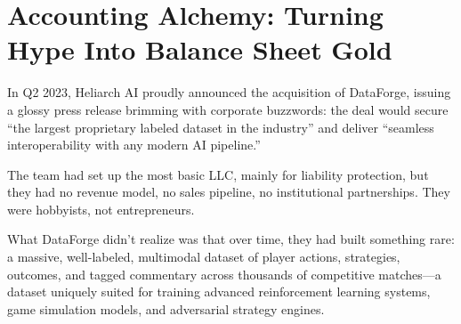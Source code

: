 \section{Accounting Alchemy: Turning Hype Into Balance Sheet Gold}

In Q2 2023, Heliarch AI proudly announced the acquisition of DataForge, issuing a glossy press release brimming with corporate buzzwords:
the deal would secure “the largest proprietary labeled dataset in the industry” and deliver “seamless interoperability with any modern AI pipeline.”

The team had set up the most basic LLC, mainly for liability protection, but they had no revenue model, no sales pipeline, no institutional partnerships. They were hobbyists, not entrepreneurs.

What DataForge didn’t realize was that over time, they had built something rare:
a massive, well-labeled, multimodal dataset of player actions, strategies, outcomes, and tagged commentary across thousands of competitive matches—a dataset uniquely suited for training advanced reinforcement learning systems, game simulation models, and adversarial strategy engines.


